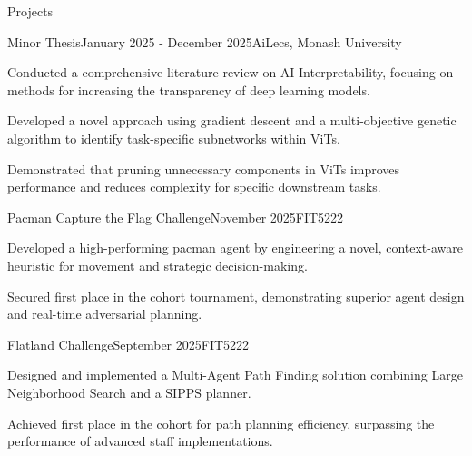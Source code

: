 \documentclass[
	10pt, %
]{resume} %
\begin{document}
\begin{rSection}{Projects}

    \begin{rSubsection}{Minor Thesis}{January 2025 - December 2025}{AiLecs, Monash University}{}
        \item Conducted a comprehensive literature review on AI Interpretability, focusing on methods for increasing the transparency of deep learning models.
        \item Developed a novel approach using gradient descent and a multi-objective genetic algorithm to identify task-specific subnetworks within ViTs.
        \item Demonstrated that pruning unnecessary components in ViTs improves performance and reduces complexity for specific downstream tasks.
    \end{rSubsection}

    \begin{rSubsection}{Pacman Capture the Flag Challenge}{November 2025}{FIT5222}{}
        \item Developed a high-performing pacman agent by engineering a novel, context-aware heuristic for movement and strategic decision-making.
        \item Secured first place in the cohort tournament, demonstrating superior agent design and real-time adversarial planning.
    \end{rSubsection}

    \begin{rSubsection}{Flatland Challenge}{September 2025}{FIT5222}{}
        \item Designed and implemented a Multi-Agent Path Finding solution combining Large Neighborhood Search and a SIPPS planner.
        \item Achieved first place in the cohort for path planning efficiency, surpassing the performance of advanced staff implementations.
    \end{rSubsection}



\end{rSection}
\end{document}
